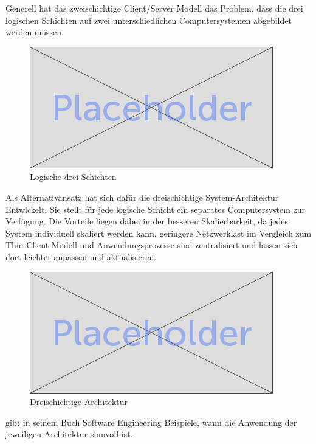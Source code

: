 	Generell hat das zweischichtige Client/Server Modell das Problem, dass die drei logischen Schichten auf zwei unterschiedlichen Computersystemen abgebildet werden müssen. \\
	
	\begin{figure}[h]
		\centering
		\includegraphics[width=0.5\linewidth]{images/placeholder}
		\caption{Logische drei Schichten}
		\label{fig:log3schichten}
	\end{figure}
	
	Als Alternativansatz hat sich dafür die dreischichtige System-Architektur Entwickelt. Sie stellt für jede logische Schicht ein separates Computersystem zur Verfügung. Die Vorteile liegen dabei in der besseren Skalierbarkeit, da jedes System individuell skaliert werden kann, geringere Netzwerklast im Vergleich zum Thin-Client-Modell und Anwendungsprozesse sind zentralisiert und lassen sich dort leichter anpassen und aktualisieren.
	

	\begin{figure}[h]
		\centering
		\includegraphics[width=0.5\linewidth]{images/placeholder}
		\caption{Dreischichtige Architektur}
		\label{fig:3-tier-architecture}
	\end{figure}


	\citeauthor{Sommerville.2007} gibt in seinem Buch Software Engineering Beispiele, wann die Anwendung der jeweiligen Architektur sinnvoll ist.
	
